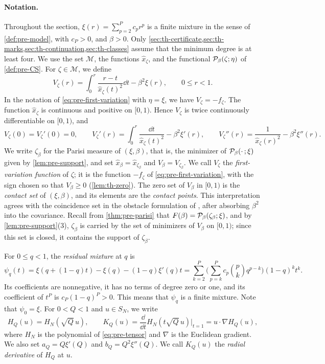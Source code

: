 \paragraph{Notation.}
Throughout the section, $\xi(r)=\sum_{p=2}^Pc_pr^p$ is a finite mixture in the sense of \cref{def:pre-model}, with $c_P>0$, and $\beta>0$. Only \cref{sec:th-certificate,sec:th-marks,sec:th-continuation,sec:th-classes} assume that the minimum degree is at least four. We use the set $\mathscr M$, the functions $\hat x_\zeta$, and the functional $\mathcal P_\beta(\zeta;\eta)$ of \cref{def:pre-CS}. For $\zeta\in\mathscr M$, we define
\begin{equation}\label{eq:th-V}
V_\zeta(r)=\int_0^r\frac{r-t}{\hat x_\zeta(t)^2}\dd t-\beta^2\xi(r),\qquad 0\le r<1.
\end{equation}
In the notation of \eqref{eq:pre-first-variation} with $\eta=\xi$, we have $V_\zeta=-f_\zeta$. The function $\hat x_\zeta$ is continuous and positive on $[0,1)$. Hence $V_\zeta$ is twice continuously differentiable on $[0,1)$, and
\begin{equation}\label{eq:th-V-derivatives}
V_\zeta(0)=V_\zeta'(0)=0,\qquad V_\zeta'(r)=\int_0^r\frac{\dd t}{\hat x_\zeta(t)^2}-\beta^2\xi'(r),\qquad V_\zeta''(r)=\frac1{\hat x_\zeta(r)^2}-\beta^2\xi''(r).
\end{equation}
We write $\zeta_\beta$ for the Parisi measure of $(\xi,\beta)$, that is, the minimizer of $\mathcal P_\beta(\cdot\,;\xi)$ given by \cref{lem:pre-support}, and set $\hat x_\beta=\hat x_{\zeta_\beta}$ and $V_\beta=V_{\zeta_\beta}$. We call $V_\zeta$ the \emph{first-variation function} of $\zeta$; it is the function $-f_\zeta$ of \eqref{eq:pre-first-variation}, with the sign chosen so that $V_\beta\ge0$ (\cref{lem:th-zero}). The zero set of $V_\beta$ in $[0,1)$ is the \emph{contact set} of $(\xi,\beta)$, and its elements are the \emph{contact points}. This interpretation agrees with the coincidence set in the obstacle formulation of \cite[Theorem~1.1]{JagannathTobasco2018contacts}, after absorbing $\beta^2$ into the covariance. Recall from \cref{thm:pre-parisi} that $F(\beta)=\mathcal P_\beta(\zeta_\beta;\xi)$, and by \cref{lem:pre-support}(3), $\zeta_\beta$ is carried by the set of minimizers of $V_\beta$ on $[0,1)$; since this set is closed, it contains the support of $\zeta_\beta$.

For $0\le q<1$, the \emph{residual mixture} at $q$ is
\begin{equation}\label{eq:th-residual-mixture}
\psi_q(t)=\xi(q+(1-q)t)-\xi(q)-(1-q)\xi'(q)t=\sum_{k=2}^P\Big(\sum_{p=k}^Pc_p\binom pkq^{p-k}\Big)(1-q)^kt^k.
\end{equation}
Its coefficients are nonnegative, it has no terms of degree zero or one, and its coefficient of $t^P$ is $c_P(1-q)^P>0$. This means that $\psi_q$ is a finite mixture. Note that $\psi_0=\xi$. For $0<Q<1$ and $u\in S_N$, we write
\[
H_Q(u)=H_N(\sqrt Q\,u),\qquad K_Q(u)=\frac{\dd}{\dd t}H_N(t\sqrt Q\,u)\Big|_{t=1}=u\cdot\nabla H_Q(u),
\]
where $H_N$ is the polynomial of \eqref{eq:pre-tensor} and $\nabla$ is the Euclidean gradient. We also set $a_Q=Q\xi'(Q)$ and $b_Q=Q^2\xi''(Q)$. We call $K_Q(u)$ the \emph{radial derivative} of $H_Q$ at $u$.

